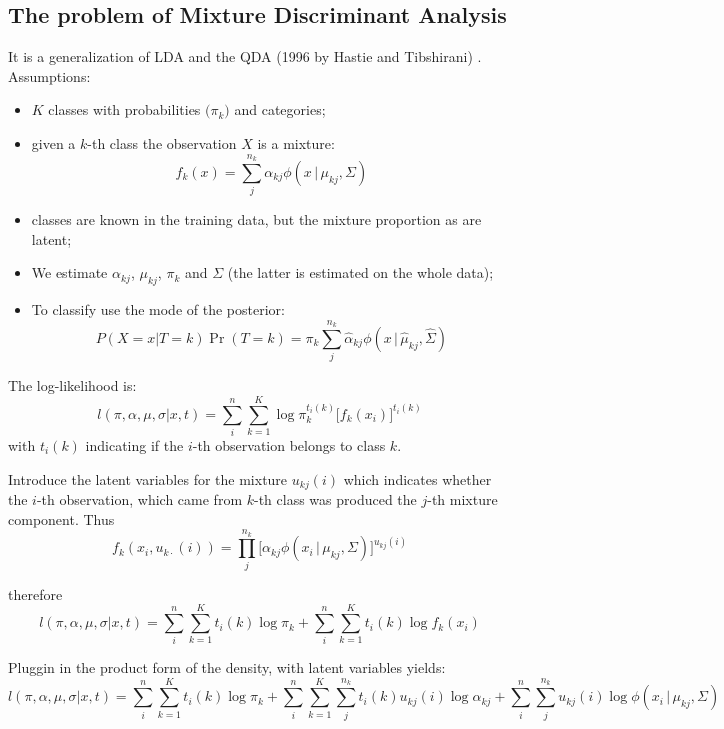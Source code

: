 \documentclass[a4paper]{article}
\begin{document}


\subsection{The problem of Mixture Discriminant Analysis} %
\label{sub:the_problem_of_mixture_discriminant_analysis}

It is a generalization of LDA and the QDA (1996 by Hastie and Tibshirani) . 
Assumptions: \begin{itemize}
	\item $K$ classes with probabilities $\big(\pi_k\big)$ and categories;
	\item given a $k$-th class the observation $X$ is a mixture:
	\[f_k(x) = \sum_j^{n_k}\alpha_{kj} \phi(x\,\lvert\,\mu_{kj}, \Sigma)\]
	\item classes are known in the training data, but the mixture proportion as are latent;
	\item We estimate $\alpha_{kj}$, $\mu_{kj}$, $\pi_k$ and $\Sigma$ (the latter is estimated on the whole data);
	\item To classify use the mode of the posterior:
	\[P(X=x\lvert T=k) \Pr(T=k) = \pi_k \sum_j^{n_k} \hat{\alpha}_{kj} \phi(x\,\lvert\,\hat{\mu}_{kj}, \hat{\Sigma})\]
\end{itemize}

The log-likelihood is:
\[l(\pi, \alpha, \mu, \sigma\lvert x, t) = \sum_i^n \sum_{k=1}^K \log \pi_k^{t_i(k)} \big[f_k(x_i)\big]^{t_i(k)}\]
with $t_i(k)$ indicating if the $i$-th observation belongs to class $k$.

Introduce the latent variables for the mixture $u_{kj}(i)$ which indicates whether the $i$-th observation, which
came from $k$-th class was produced the $j$-th mixture component. Thus
\[f_k(x_i, u_{k\cdot}(i)) = \prod_j^{n_k} \big[ \alpha_{kj} \phi(x_i\,\lvert\,\mu_{kj}, \Sigma)\big]^{u_{kj}(i)}\]

therefore
\[l(\pi, \alpha, \mu, \sigma\lvert x, t)
= \sum_i^n \sum_{k=1}^K t_i(k) \log \pi_k + \sum_i^n \sum_{k=1}^K t_i(k) \log f_k(x_i)\]

Pluggin in the product form of the density, with latent variables yields:
\[l(\pi, \alpha, \mu, \sigma\lvert x, t)
= \sum_i^n \sum_{k=1}^K t_i(k) \log \pi_k
+ \sum_i^n \sum_{k=1}^K \sum_j^{n_k} t_i(k) u_{kj}(i) \log \alpha_{kj}
+ \sum_i^n \sum_j^{n_k} u_{kj}(i) \log \phi(x_i\,\lvert\,\mu_{kj}, \Sigma)\]
\end{document}
